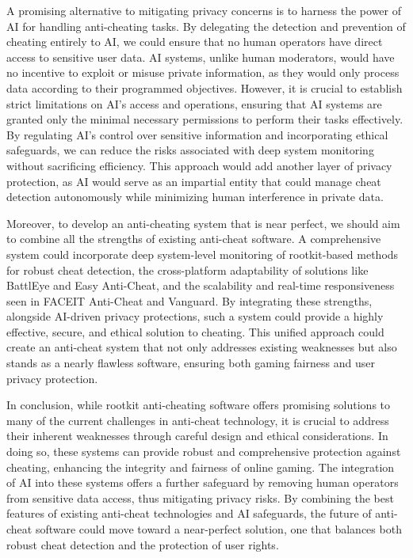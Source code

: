 \documentclass[a4paper, 12pt]{article}
\begin{document}
A promising alternative to mitigating privacy concerns is to harness the power of AI for handling anti-cheating tasks. By delegating the detection and prevention of cheating entirely to AI, we could ensure that no human operators have direct access to sensitive user data. AI systems, unlike human moderators, would have no incentive to exploit or misuse private information, as they would only process data according to their programmed objectives. However, it is crucial to establish strict limitations on AI's access and operations, ensuring that AI systems are granted only the minimal necessary permissions to perform their tasks effectively. By regulating AI’s control over sensitive information and incorporating ethical safeguards, we can reduce the risks associated with deep system monitoring without sacrificing efficiency. This approach would add another layer of privacy protection, as AI would serve as an impartial entity that could manage cheat detection autonomously while minimizing human interference in private data.

Moreover, to develop an anti-cheating system that is near perfect, we should aim to combine all the strengths of existing anti-cheat software. A comprehensive system could incorporate deep system-level monitoring of rootkit-based methods for robust cheat detection, the cross-platform adaptability of solutions like BattlEye and Easy Anti-Cheat, and the scalability and real-time responsiveness seen in FACEIT Anti-Cheat and Vanguard. By integrating these strengths, alongside AI-driven privacy protections, such a system could provide a highly effective, secure, and ethical solution to cheating. This unified approach could create an anti-cheat system that not only addresses existing weaknesses but also stands as a nearly flawless software, ensuring both gaming fairness and user privacy protection.

In conclusion, while rootkit anti-cheating software offers promising solutions to many of the current challenges in anti-cheat technology, it is crucial to address their inherent weaknesses through careful design and ethical considerations. In doing so, these systems can provide robust and comprehensive protection against cheating, enhancing the integrity and fairness of online gaming. The integration of AI into these systems offers a further safeguard by removing human operators from sensitive data access, thus mitigating privacy risks. By combining the best features of existing anti-cheat technologies and AI safeguards, the future of anti-cheat software could move toward a near-perfect solution, one that balances both robust cheat detection and the protection of user rights.
\end{document}
